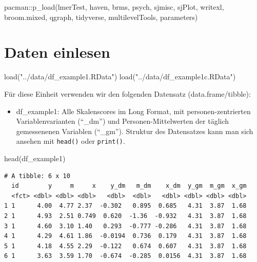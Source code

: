 \documentclass[
  letterpaper,
  DIV=11,
  numbers=noendperiod]{scrreprt}
\newenvironment{Shaded}{\begin{snugshade}}{\end{snugshade}}
\newcommand{\FunctionTok}[1]{\textcolor[rgb]{0.28,0.35,0.67}{#1}}
\newcommand{\NormalTok}[1]{\textcolor[rgb]{0.00,0.23,0.31}{#1}}
\newcommand{\SpecialCharTok}[1]{\textcolor[rgb]{0.37,0.37,0.37}{#1}}
\newcommand{\StringTok}[1]{\textcolor[rgb]{0.13,0.47,0.30}{#1}}
\providecommand{\tightlist}{%
  \setlength{\itemsep}{0pt}\setlength{\parskip}{0pt}}\usepackage{longtable,booktabs,array}
\begin{document}
\begin{Shaded}
\begin{Highlighting}[]
\NormalTok{pacman}\SpecialCharTok{::}\FunctionTok{p\_load}\NormalTok{(lmerTest, haven, brms, psych,}
\NormalTok{               sjmisc, sjPlot, writexl, broom.mixed, qgraph,}
\NormalTok{               tidyverse, multilevelTools, parameters)}
\end{Highlighting}
\end{Shaded}

\section{Daten einlesen}\label{daten-einlesen-1}

\begin{Shaded}
\begin{Highlighting}[]
\FunctionTok{load}\NormalTok{(}\StringTok{"../data/df\_example1.RData"}\NormalTok{)}
\FunctionTok{load}\NormalTok{(}\StringTok{"../data/df\_example1c.RData"}\NormalTok{)}
\end{Highlighting}
\end{Shaded}

Für diese Einheit verwenden wir den folgenden Datensatz
(data.frame/tibble):

\begin{itemize}
\tightlist
\item
  df\_example1: Alle Skalenscores im Long Format, mit
  personen-zentrierten Variablenvarianten (``\_dm'') und
  Personen-Mittelwerten der täglich gemessenenen Variablen (``\_gm'').
  Struktur des Datensatzes kann man sich ansehen mit \texttt{head()}
  oder \texttt{print()}.
\end{itemize}

\begin{Shaded}
\begin{Highlighting}[]
\FunctionTok{head}\NormalTok{(df\_example1)}
\end{Highlighting}
\end{Shaded}

\begin{verbatim}
# A tibble: 6 x 10
  id        y     m     x    y_dm   m_dm    x_dm  y_gm  m_gm  x_gm
  <fct> <dbl> <dbl> <dbl>   <dbl>  <dbl>   <dbl> <dbl> <dbl> <dbl>
1 1      4.00  4.77 2.37  -0.302   0.895  0.685   4.31  3.87  1.68
2 1      4.93  2.51 0.749  0.620  -1.36  -0.932   4.31  3.87  1.68
3 1      4.60  3.10 1.40   0.293  -0.777 -0.286   4.31  3.87  1.68
4 1      4.29  4.61 1.86  -0.0194  0.736  0.179   4.31  3.87  1.68
5 1      4.18  4.55 2.29  -0.122   0.674  0.607   4.31  3.87  1.68
6 1      3.63  3.59 1.70  -0.674  -0.285  0.0156  4.31  3.87  1.68
\end{verbatim}
\end{document}
